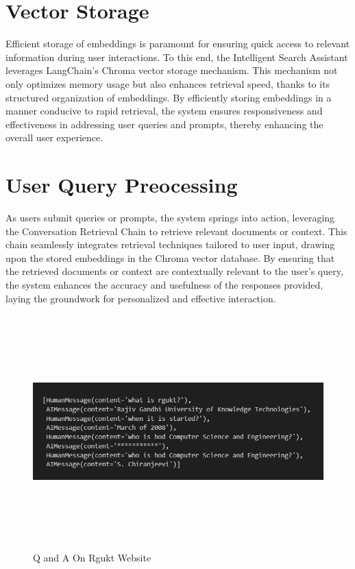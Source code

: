 \documentclass[12pt,a4paper,oneside]{report}
\begin{document}
\section{Vector Storage}
\par Efficient storage of embeddings is paramount for ensuring quick access to relevant information during user interactions. To this end, the Intelligent Search Assistant leverages LangChain's Chroma vector storage mechanism. This mechanism not only optimizes memory usage but also enhances retrieval speed, thanks to its structured organization of embeddings. By efficiently storing embeddings in a manner conducive to rapid retrieval, the system ensures responsiveness and effectiveness in addressing user queries and prompts, thereby enhancing the overall user experience.

\section{User Query Preocessing}
\par As users submit queries or prompts, the system springs into action, leveraging the Conversation Retrieval Chain to retrieve relevant documents or context. This chain seamlessly integrates retrieval techniques tailored to user input, drawing upon the stored embeddings in the Chroma vector database. By ensuring that the retrieved documents or context are contextually relevant to the user's query, the system enhances the accuracy and usefulness of the responses provided, laying the groundwork for personalized and effective interaction.
\begin{figure}[ht]
    \centering
    \includegraphics[width=125mm , height = 90mm]{images/rgukt-01.png}
    \caption{Q and A On Rgukt Website}
    \label{fig:figure2_2}
\end{figure}
\end{document}
